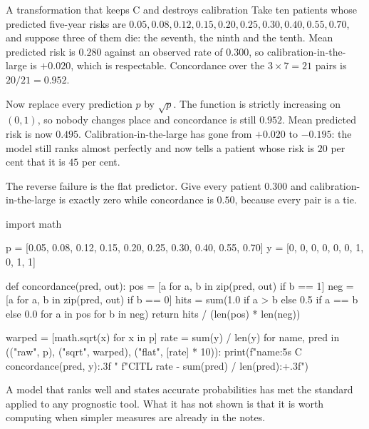 \begin{workedexample}{A transformation that keeps C and destroys calibration}
Take ten patients whose predicted five-year risks are
$0.05,0.08,0.12,0.15,0.20,0.25,0.30,0.40,0.55,0.70$, and suppose three of
them die: the seventh, the ninth and the tenth. Mean predicted risk is $0.280$
against an observed rate of $0.300$, so calibration-in-the-large is $+0.020$,
which is respectable. Concordance over the $3\times7=21$ pairs is $20/21=0.952$.

Now replace every prediction $p$ by $\sqrt p$. The function is strictly
increasing on $(0,1)$, so nobody changes place and concordance is still
$0.952$. Mean predicted risk is now $0.495$. Calibration-in-the-large has gone
from $+0.020$ to $-0.195$: the model still ranks almost perfectly and now tells
a patient whose risk is $20$ per cent that it is $45$ per cent.

The reverse failure is the flat predictor. Give every patient $0.300$ and
calibration-in-the-large is exactly zero while concordance is $0.50$, because
every pair is a tie.

\begin{wecode}[Python]
import math

p = [0.05, 0.08, 0.12, 0.15, 0.20, 0.25, 0.30, 0.40, 0.55, 0.70]
y = [0, 0, 0, 0, 0, 0, 1, 0, 1, 1]

def concordance(pred, out):
    pos = [a for a, b in zip(pred, out) if b == 1]
    neg = [a for a, b in zip(pred, out) if b == 0]
    hits = sum(1.0 if a > b else 0.5 if a == b else 0.0
               for a in pos for b in neg)
    return hits / (len(pos) * len(neg))

warped = [math.sqrt(x) for x in p]
rate = sum(y) / len(y)
for name, pred in (("raw", p), ("sqrt", warped), ("flat", [rate] * 10)):
    print(f"{name:5s} C {concordance(pred, y):.3f}  "
          f"CITL {rate - sum(pred) / len(pred):+.3f}")
\end{wecode}

\end{workedexample}

A model that ranks well and states accurate probabilities has met the standard applied to any prognostic tool. What it has not shown is that it is worth computing when simpler measures are already in the notes.

